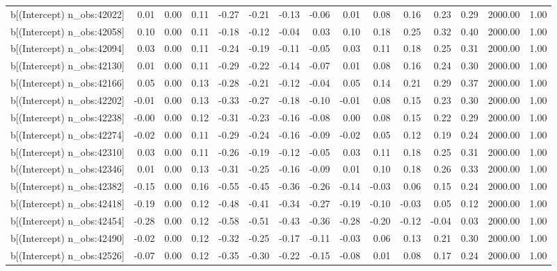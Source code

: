 \begin{table}[ht]
\begin{tabular}{rrrrrrrrrrrrrrr}
  b[(Intercept) n\_obs:42022] & 0.01 & 0.00 & 0.11 & -0.27 & -0.21 & -0.13 & -0.06 & 0.01 & 0.08 & 0.16 & 0.23 & 0.29 & 2000.00 & 1.00 \\ 
  b[(Intercept) n\_obs:42058] & 0.10 & 0.00 & 0.11 & -0.18 & -0.12 & -0.04 & 0.03 & 0.10 & 0.18 & 0.25 & 0.32 & 0.40 & 2000.00 & 1.00 \\ 
  b[(Intercept) n\_obs:42094] & 0.03 & 0.00 & 0.11 & -0.24 & -0.19 & -0.11 & -0.05 & 0.03 & 0.11 & 0.18 & 0.25 & 0.31 & 2000.00 & 1.00 \\ 
  b[(Intercept) n\_obs:42130] & 0.01 & 0.00 & 0.11 & -0.29 & -0.22 & -0.14 & -0.07 & 0.01 & 0.08 & 0.16 & 0.24 & 0.30 & 2000.00 & 1.00 \\ 
  b[(Intercept) n\_obs:42166] & 0.05 & 0.00 & 0.13 & -0.28 & -0.21 & -0.12 & -0.04 & 0.05 & 0.14 & 0.21 & 0.29 & 0.37 & 2000.00 & 1.00 \\ 
  b[(Intercept) n\_obs:42202] & -0.01 & 0.00 & 0.13 & -0.33 & -0.27 & -0.18 & -0.10 & -0.01 & 0.08 & 0.15 & 0.23 & 0.30 & 2000.00 & 1.00 \\ 
  b[(Intercept) n\_obs:42238] & -0.00 & 0.00 & 0.12 & -0.31 & -0.23 & -0.16 & -0.08 & 0.00 & 0.08 & 0.15 & 0.22 & 0.29 & 2000.00 & 1.00 \\ 
  b[(Intercept) n\_obs:42274] & -0.02 & 0.00 & 0.11 & -0.29 & -0.24 & -0.16 & -0.09 & -0.02 & 0.05 & 0.12 & 0.19 & 0.24 & 2000.00 & 1.00 \\ 
  b[(Intercept) n\_obs:42310] & 0.03 & 0.00 & 0.11 & -0.26 & -0.19 & -0.12 & -0.05 & 0.03 & 0.11 & 0.18 & 0.25 & 0.31 & 2000.00 & 1.00 \\ 
  b[(Intercept) n\_obs:42346] & 0.01 & 0.00 & 0.13 & -0.31 & -0.25 & -0.16 & -0.09 & 0.01 & 0.10 & 0.18 & 0.26 & 0.33 & 2000.00 & 1.00 \\ 
  b[(Intercept) n\_obs:42382] & -0.15 & 0.00 & 0.16 & -0.55 & -0.45 & -0.36 & -0.26 & -0.14 & -0.03 & 0.06 & 0.15 & 0.24 & 2000.00 & 1.00 \\ 
  b[(Intercept) n\_obs:42418] & -0.19 & 0.00 & 0.12 & -0.48 & -0.41 & -0.34 & -0.27 & -0.19 & -0.10 & -0.03 & 0.05 & 0.12 & 2000.00 & 1.00 \\ 
  b[(Intercept) n\_obs:42454] & -0.28 & 0.00 & 0.12 & -0.58 & -0.51 & -0.43 & -0.36 & -0.28 & -0.20 & -0.12 & -0.04 & 0.03 & 2000.00 & 1.00 \\ 
  b[(Intercept) n\_obs:42490] & -0.02 & 0.00 & 0.12 & -0.32 & -0.25 & -0.17 & -0.11 & -0.03 & 0.06 & 0.13 & 0.21 & 0.30 & 2000.00 & 1.00 \\ 
  b[(Intercept) n\_obs:42526] & -0.07 & 0.00 & 0.12 & -0.35 & -0.30 & -0.22 & -0.15 & -0.08 & 0.01 & 0.08 & 0.17 & 0.24 & 2000.00 & 1.00 \\ 

\end{tabular}
\end{table}
